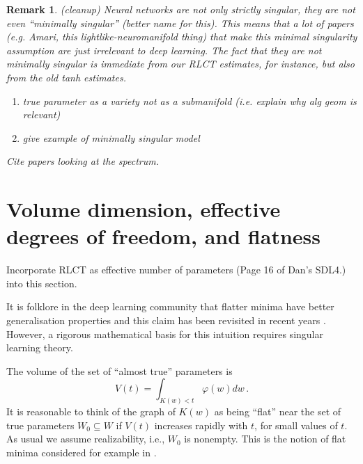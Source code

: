 \documentclass{article} %
\newtheorem{remark}[theorem]{Remark}
\begin{document}
\begin{remark} (cleanup)
Neural networks are not only strictly singular, they are not even ``minimally singular'' (better name for this). This means that a lot of papers (e.g. Amari, this lightlike-neuromanifold thing) that make this minimal singularity assumption are just irrelevant to deep learning. The fact that they are not minimally singular is immediate from our RLCT estimates, for instance, but also from the old tanh estimates.
\begin{enumerate}
    \item true parameter as a variety not as a submanifold (i.e. explain why alg geom is relevant)
    \item give example of minimally singular model
\end{enumerate}
Cite papers looking at the spectrum.
\end{remark}

\section{Volume dimension, effective degrees of freedom, and flatness}
\label{section:no_flat_minima}

Incorporate RLCT as effective number of parameters (Page 16 of Dan's SDL4.) into this section.


It is folklore in the deep learning community that flatter minima have better generalisation properties \citep{hinton1993keeping, hochreiter1997flat} and this claim has been revisited in recent years \citep{chaudhari2019entropy, smith2017bayesian, jastrzkebski2017three, Zhang:2018MolPh.116.3214Z}. However, a rigorous mathematical basis for this intuition requires singular learning theory.

The volume of the set of ``almost true'' parameters is
\[
V(t) = \int_{K(w) < t} \varphi(w) dw\,.
\]
It is reasonable to think of the graph of $K(w)$ as being ``flat'' near the set of true parameters $W_0 \subseteq W$ if $V(t)$ increases rapidly with $t$, for small values of $t$. As usual we assume realizability, i.e., $W_0$ is nonempty. This is the notion of flat minima considered for example in \citep{hochreiter1997flat}.
\end{document}
